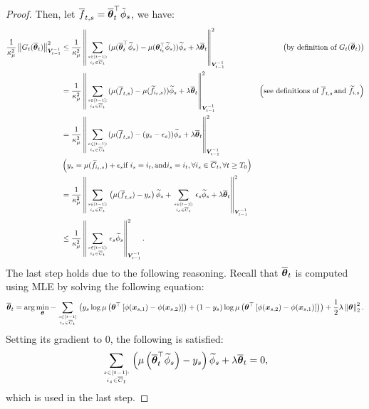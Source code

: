 \begin{proof}
Then, let $\overline f_{t,s}=\overline{\boldsymbol{\theta}}_t^\top\tilde\phi_s$, we have:
\begin{align*}
\frac{1}{\kappa_\mu^2} \left\| G_t(\overline{\boldsymbol{\theta}}_t) \right\|_{\boldsymbol{V}_{t-1}^{-1}}^2
    &\leq \frac{1}{\kappa_\mu^2} \left\| \sum_{s\in[t-1]:\atop i_s\in\overline{C}_t} (\mu(\overline{\boldsymbol{\theta}}_t^\top \widetilde{\phi}_s ) - \mu(\boldsymbol{\theta}_{i_t}^\top \widetilde{\phi}_s) ) \widetilde{\phi}_s + \lambda \overline{\boldsymbol{\theta}}_t \right\|_{\boldsymbol{V}_{t-1}^{-1}}^2  & \left(\text{by definition of } G_t(\overline{\boldsymbol{\theta}}_t) \right) \\
    &= \frac{1}{\kappa_\mu^2} \left\| \sum_{s\in[t-1]:\atop i_s\in\overline{C}_t} (\mu(\overline f_{t,s}) - \mu(\widetilde{f}_{i_t,s}) ) \widetilde{\phi}_s + \lambda \overline{\boldsymbol{\theta}}_t \right\|_{\boldsymbol{V}_{t-1}^{-1}}^2 
    & \left(\text{see definitions of } \overline f_{t,s}\, \text{and } \widetilde{f}_{i,s} \right) \\
    &= \frac{1}{\kappa_\mu^2} \left\| \sum_{s\in[t-1]:\atop i_s\in\overline{C}_t} (\mu(\overline f_{t,s}) - (y_s - \epsilon_s) ) \widetilde{\phi}_s + \lambda \overline{\boldsymbol{\theta}}_t \right\|_{\boldsymbol{V}_{t-1}^{-1}}^2  \notag\\
    & \left(y_s = \mu(\widetilde{f}_{i_t,s}) + \epsilon_s \text{if } i_s=i_t, \text{and} i_s=i_t, \forall i_s\in \overline{C}_t, \forall t\geq T_0 \right) \\
    &= \frac{1}{\kappa_\mu^2} \left\| \sum_{s\in[t-1]:\atop i_s\in\overline{C}_t} \left(\mu(\overline f_{t,s}) - y_s\right) \widetilde{\phi}_s + \sum_{s\in[t-1]:\atop i_s\in\overline{C}_t}\epsilon_s \widetilde{\phi}_s  + \lambda \overline{\boldsymbol{\theta}}_t \right\|_{\boldsymbol{V}_{t-1}^{-1}}^2 \\
    &\leq \frac{1}{\kappa_\mu^2} \left\| \sum_{s\in[t-1]:\atop i_s\in\overline{C}_t}\epsilon_s \widetilde{\phi}_s \right\|_{\boldsymbol{V}_{t-1}^{-1}}^2.
\end{align*}
The last step holds due to the following reasoning. Recall that $\overline{\boldsymbol{\theta}}_t$ is computed using MLE by solving the following equation:
    \begin{equation}
        \overline{\boldsymbol{\theta}}_t=\arg\min_{\boldsymbol{\theta}} - \sum_{s\in[t-1]\atop i_s\in \overline C_t}\left( y_s\log\mu\left({\boldsymbol{\theta}}^{\top}\left[\phi(\boldsymbol{x}_{s,1}) - \phi(\boldsymbol{x}_{s,2})\right]\right) + (1-y_s)\log\mu\left({\boldsymbol{\theta}}^{\top}\left[\phi(\boldsymbol{x}_{s,2}) - \phi(\boldsymbol{x}_{s,1})\right]\right) \right) + \frac{1}{2}\lambda\left\| \boldsymbol{\theta} \right\|_2^2.
    \end{equation}
Setting its gradient to $0$, the following is satisfied:
\begin{equation}
    \sum_{s\in[t-1]:\atop i_s\in\overline{C}_t} \left(\mu\left( \overline{\boldsymbol{\theta}}_t^{\top} \widetilde{\phi}_s \right) - y_s\right) \widetilde{\phi}_s + \lambda \overline{\boldsymbol{\theta}}_t = 0,
\end{equation}
which is used in the last step.


\end{proof}
